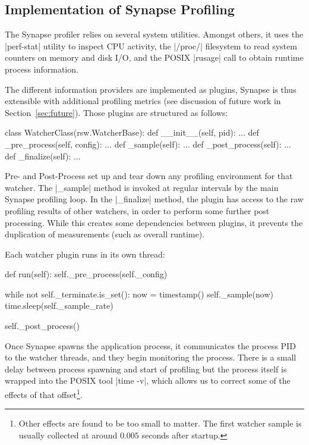 \documentclass[10pt, conference, compsocconf]{IEEEtran}
\newcommand{\synapse}{Synapse\xspace}
\newcommand{\Synapse}{Synapse\xspace}
\begin{document}
 
 \subsection{Implementation of \Synapse Profiling}
 
 The \synapse profiler relies on several system utilities.  Amongst
 others, it uses the |perf-stat| utility to inspect CPU activity, the
 |/proc/| filesystem to read system counters on memory and disk I/O,
 and the POSIX |rusage| call to obtain runtime process information.

 The different information providers are implemented as plugins,
 \synapse is thus extensible with additional profiling metrics (see
 discussion of future work in Section~\ref{sec:future}). Those
 plugins are structured as follows:

 \begin{myio}
 class WatcherClass(rsw.WatcherBase):
     def __init__(self, pid):
         ...
     def _pre_process(self, config): 
         ...
     def _sample(self): 
         ...
     def _post_process(self): 
         ...
     def _finalize(self): 
         ...
 \end{myio}

 Pre- and Post-Process set up and tear down any profiling environment
 for that watcher.  The |_sample| method is invoked at regular
 intervals by the main \synapse profiling loop.  In the |_finalize|
 method, the plugin has access to the raw profiling results of other
 watchers, in order to perform some further post processing.  While this
 creates some dependencies between plugins, it prevents the
 duplication of measurements (such as overall runtime).

 Each watcher plugin runs in its own thread:

 \begin{myio}
 def run(self):
     self._pre_process(self._config)

     while not self._terminate.is_set():
         now = timestamp()
         self._sample(now)
         time.sleep(self._sample_rate)

     self._post_process()
 \end{myio}

 Once \synapse spawns the application process, it communicates the
 process PID to the watcher threads, and they begin monitoring the
 process.  There is a small delay between process spawning and start
 of profiling but the process itself is wrapped into the POSIX tool
 |time -v|, which allows us to correct some of the effects of that
 offset\footnote{Other effects are found to be too small to matter.
 The first watcher sample is usually collected at around $0.005$
 seconds after startup.}.
\end{document}
